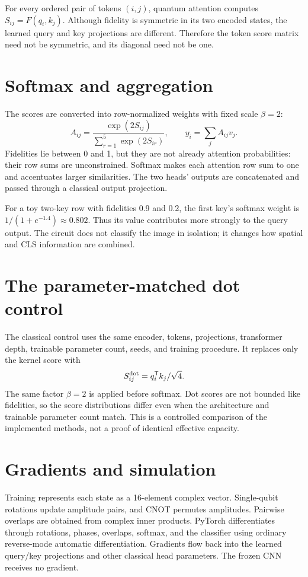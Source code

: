 \documentclass[11pt,a4paper]{report}
\begin{document}
For every ordered pair of tokens $(i,j)$, quantum attention computes $S_{ij}=F(q_i,k_j)$. Although fidelity is symmetric in its two encoded states, the learned query and key projections are different. Therefore the token score matrix need not be symmetric, and its diagonal need not be one.

\section{Softmax and aggregation}
The scores are converted into row-normalized weights with fixed scale $\beta=2$:
\begin{equation}
A_{ij}=\frac{\exp(2S_{ij})}{\sum_{r=1}^{5}\exp(2S_{ir})},
\qquad y_i=\sum_j A_{ij}v_j.
\end{equation}
Fidelities lie between 0 and 1, but they are not already attention probabilities: their row sums are unconstrained. Softmax makes each attention row sum to one and accentuates larger similarities. The two heads' outputs are concatenated and passed through a classical output projection.

For a toy two-key row with fidelities 0.9 and 0.2, the first key's softmax weight is $1/(1+e^{-1.4})\approx0.802$. Thus its value contributes more strongly to the query output. The circuit does not classify the image in isolation; it changes how spatial and CLS information are combined.

\section{The parameter-matched dot control}
The classical control uses the same encoder, tokens, projections, transformer depth, trainable parameter count, seeds, and training procedure. It replaces only the kernel score with
\begin{equation}
S_{ij}^{\rm dot}=q_i^\mathsf T k_j/\sqrt4.
\end{equation}
The same factor $\beta=2$ is applied before softmax. Dot scores are not bounded like fidelities, so the score distributions differ even when the architecture and trainable parameter count match. This is a controlled comparison of the implemented methods, not a proof of identical effective capacity.

\section{Gradients and simulation}
Training represents each state as a 16-element complex vector. Single-qubit rotations update amplitude pairs, and CNOT permutes amplitudes. Pairwise overlaps are obtained from complex inner products. PyTorch differentiates through rotations, phases, overlaps, softmax, and the classifier using ordinary reverse-mode automatic differentiation. Gradients flow back into the learned query/key projections and other classical head parameters. The frozen CNN receives no gradient.
\end{document}
